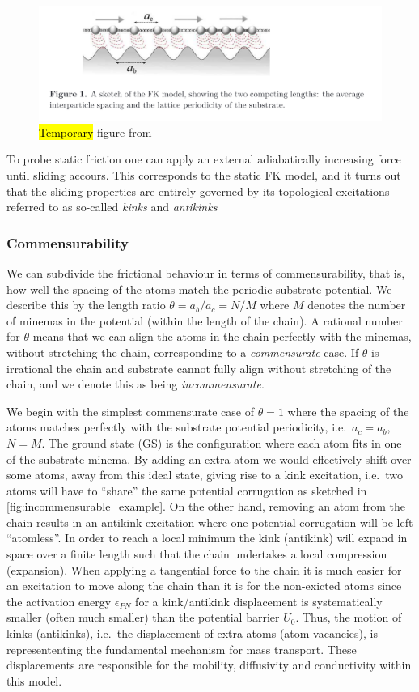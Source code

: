 \begin{figure}[H]
  \centering
  \includegraphics[width=0.8\linewidth]{figures/theory/FK_model.png}
  \caption{\hl{Temporary} figure from \cite{Manini_2016}}
  \label{fig:FK_model}
\end{figure}

To probe static friction one can apply an external adiabatically increasing force until sliding accours. This corresponds to the static FK model, and it turns out that the sliding properties are entirely governed by its topological excitations referred to as so-called \textit{kinks} and \textit{antikinks}

\subsubsection{Commensurability} We can subdivide the frictional behaviour in terms of commensurability, that is, how well the spacing of the atoms match the periodic substrate potential. We describe this by the length ratio $\theta = a_b / a_c = N / M$ where $M$ denotes the number of minemas in the potential (within the length of the chain). A rational number for $\theta$ means that we can align the atoms in the chain perfectly with the minemas, without stretching the chain, corresponding to a \textit{commensurate} case. If $\theta$ is irrational the chain and substrate cannot fully align without stretching of the chain, and we denote this as being \textit{incommensurate}.

We begin with the simplest commensurate case of $\theta = 1$ where the spacing
of the atoms matches perfectly with the substrate potential periodicity, i.e.\
$a_c = a_b$, $N = M$. The ground state (GS) is the configuration where each atom
fits in one of the substrate minema. By adding an extra atom we would
effectively shift over some atoms, away from this ideal state, giving rise to a
kink excitation, i.e.\ two atoms will have to ``share'' the same potential
corrugation as sketched in \cref{fig:incommensurable_example}.  On the
other hand, removing an atom from the chain results in an antikink excitation
where one potential corrugation will be left ``atomless''. In order to reach a
local minimum the kink (antikink) will expand in space over a finite length such
that the chain undertakes a local compression (expansion). When applying a
tangential force to the chain it is much easier for an excitation to move along
the chain than it is for the non-exicted atoms since the activation energy
$\epsilon_{PN}$ for a kink/antikink displacement is systematically smaller
(often much smaller) than the potential barrier $U_0$. Thus, the motion of kinks
(antikinks), i.e.\ the displacement of extra atoms (atom vacancies), is
represententing the fundamental mechanism for mass transport. These
displacements are responsible for the mobility, diffusivity and conductivity
within this model. 

